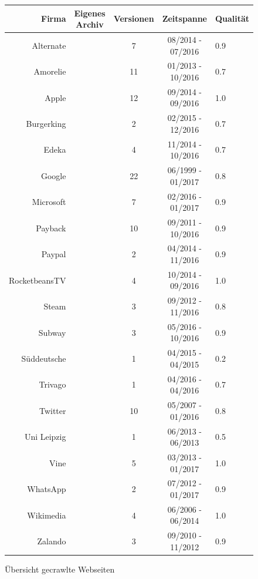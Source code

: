 \documentclass{article}
\newcommand{\cmark}{\ding{51}}%
\newcommand{\xmark}{\ding{55}}%
\begin{document}
	\begin{figure}[ht]
		\centering
		\begin{tabularx}{\textwidth}{|r|c|c|c|X|}
			\hline
			\textbf{Firma} & \textbf{Eigenes Archiv} & \textbf{Versionen} & \textbf{Zeitspanne} & \textbf{Qualität} \\ \hline \hline
			Alternate & \xmark & 7 & 08/2014 - 07/2016 &  0.9 \\ \hline
			Amorelie & \xmark & 11 & 01/2013 - 10/2016 &  0.7 \\ \hline
			Apple & \xmark & 12 & 09/2014 - 09/2016 &  1.0 \\ \hline
			Burgerking & \xmark & 2 & 02/2015 - 12/2016 &  0.7 \\ \hline
			Edeka & \xmark & 4 & 11/2014 - 10/2016 &  0.7 \\ \hline
			Google & \cmark & 22 & 06/1999 - 01/2017 &  0.8 \\ \hline
			Microsoft & \xmark & 7 & 02/2016 - 01/2017 &  0.9 \\ \hline
			Payback & \xmark & 10 & 09/2011 - 10/2016 &  0.9 \\ \hline
			Paypal & \xmark & 2 & 04/2014 - 11/2016 &  0.9 \\ \hline
			RocketbeansTV & \xmark & 4 & 10/2014 - 09/2016 &  1.0 \\ \hline
			Steam & \xmark & 3 & 09/2012 - 11/2016 &  0.8 \\ \hline
			Subway & \xmark & 3 & 05/2016 - 10/2016 &  0.9 \\ \hline
			Süddeutsche & \xmark & 1 & 04/2015 - 04/2015 &  0.2 \\ \hline
			Trivago & \xmark & 1 & 04/2016 - 04/2016 &  0.7 \\ \hline
			Twitter & \cmark & 10 & 05/2007 - 01/2016 &  0.8 \\ \hline
			Uni Leipzig & \xmark & 1 & 06/2013 - 06/2013 &  0.5 \\ \hline
			Vine & \xmark & 5 & 03/2013 - 01/2017 &  1.0 \\ \hline
			WhatsApp & \cmark & 2 & 07/2012 - 01/2017 &  0.9 \\ \hline
			Wikimedia & \cmark & 4 & 06/2006 - 06/2014 &  1.0 \\ \hline
			Zalando & \xmark & 3 & 09/2010 - 11/2012 &  0.9 \\ \hline
		\end{tabularx}
		\caption{Übersicht gecrawlte Webseiten}
		\label{fig:crawl-tab}
	\end{figure}
	
\end{document}
